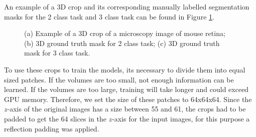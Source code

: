 An example of a \ac{3D} crop and its corresponding manually labelled segmentation masks for the 2 class task and 3 class task can be found in Figure \ref{fig:dataset_original}.

\begin{figure}[!htb]
	\centering
	\hfil
  \hfil 
	\caption{(a) Example of a \ac{3D} crop of a microscopy image of mouse retina; (b) \ac{3D} ground truth mask for 2 class task; (c) \ac{3D} ground truth mask for 3 class task.}
	\label{fig:dataset_original}
\end{figure}

To use these crops to train the models, its necessary to divide them into equal sized patches. If the volumes are too small, not enough information can be learned. If the volumes are too large, training will take longer and could exceed GPU memory. Therefore, we set the size of these patches to 64x64x64. Since the $z$-axis of the original images has a size between 55 and 61, the crops had to be padded to get the 64 slices in the $z$-axis for the input images, for this purpose a reflection padding was applied.

